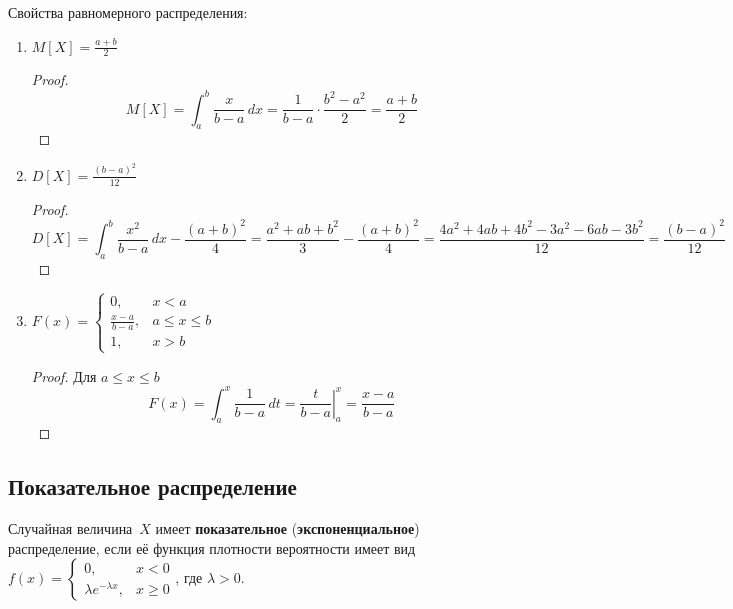 Свойства равномерного распределения:
\begin{enumerate}
	\item $\displaystyle M[X] = \frac{a + b}2$
	\begin{proof}
	\begin{equation*}
	M[X] =
	\int_a^b \frac{x}{b - a}\,dx =
	\frac1{b - a} \cdot \frac{b^2 - a^2}2 =
	\frac{a + b}2
	\end{equation*}
	\end{proof}
	
	\item $\displaystyle D[X] = \frac{(b - a)^2}{12}$
	\begin{proof}
	\begin{equation*}
	D[X] =
	\int_a^b \frac{x^2}{b - a}\,dx - \frac{(a + b)^2}4 =
	\frac{a^2 + ab + b^2}3 - \frac{(a + b)^2}4 =
	\frac{4a^2 + 4ab + 4b^2 - 3a^2 - 6ab - 3b^2}{12} =
	\frac{(b - a)^2}{12}
	\end{equation*}
	\end{proof}
	
	\item $\displaystyle F(x) =
	\begin{cases}
	0, & x < a \\
	\frac{x - a}{b - a}, & a \leqslant x \leqslant b \\
	1, & x > b
	\end{cases}$
	\begin{proof}
	Для $a \leqslant x \leqslant b$
	\begin{equation*}
	F(x) =
	\int_a^x \frac1{b - a}\,dt =
	\left. \frac{t}{b - a} \right|_a^x =
	\frac{x - a}{b - a}
	\end{equation*}
	\end{proof}
\end{enumerate}

\subsection{Показательное распределение}
  Случайная величина~$X$ имеет \textbf{показательное} (\textbf{экспоненциальное}) распределение, если её функция плотности вероятности имеет вид $f(x) =
\begin{cases}
0, & x < 0 \\
\lambda e^{-\lambda x}, & x \geqslant 0
\end{cases}$,
где $\lambda > 0$.

